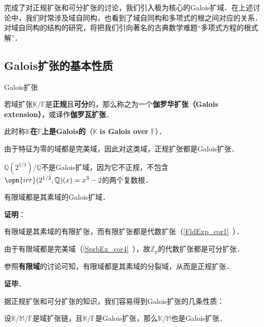 

完成了对正规扩张和可分扩张的讨论，我们引入极为核心的Galois扩域．在上述讨论中，我们时常涉及域自同构，也看到了域自同构和多项式的根之间对应的关系．对域自同构的结构的研究，将把我们引向著名的古典数学难题“多项式方程的根式解”．



\subsection{Galois扩张的基本性质}

\begin{definition}{Galois扩张}

若域扩张$\mathbb{K}/\mathbb{F}$是\textbf{正规}且\textbf{可分}的，那么称之为一个\textbf{伽罗华扩张（Galois extension）}，或译作\textbf{伽罗瓦扩张}．

此时称$\mathbb{K}$\textbf{在}$\mathbb{F}$\textbf{上是Galois的}（$\mathbb{K}$ \textbf{is Galois over} $\mathbb{F}$）．

\end{definition}

由于特征为零的域都是完美域，因此对这类域，正规扩张都是Galois扩张．

\begin{example}{}
$\mathbb{Q}(2^{1/3})/\mathbb{Q}$不是Galois扩域，因为它不正规，不包含$\opn{irr}(2^{1/3}, \mathbb{Q})(x)=x^3-2$的两个复数根．
\end{example}

\begin{theorem}{}
有限域都是其素域的Galois扩域．
\end{theorem}

\textbf{证明}：

有限域是其素域的有限扩张，而有限扩张都是代数扩张（\autoref{FldExp_cor1}~）．

由于有限域都是完美域（\autoref{SprbEx_cor4}~），故$\mathbb{Z}_p$的代数扩张都是可分扩张．

参照\textbf{有限域}的讨论可知，有限域都是其素域的分裂域，从而是正规扩张．

\textbf{证毕}．


据正规扩张和可分扩张的知识，我们容易得到Galois扩张的几条性质：


\begin{theorem}{}
设$\mathbb{K}/\mathbb{M}/\mathbb{F}$是域扩张链，且$\mathbb{K}/\mathbb{F}$是Galois扩张，那么$\mathbb{K}/\mathbb{M}$也是Galois扩张．
\end{theorem}

